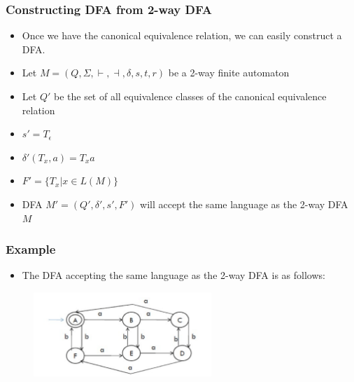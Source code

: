 \documentclass{beamer}
\newcommand{\emptyword}{\ensuremath{\epsilon}}
\begin{document}
\begin{frame}
\frametitle{Constructing DFA from 2-way DFA}
\begin{itemize}
\item Once we have the canonical equivalence relation, we can easily construct a DFA.
\item Let $M = (Q, \Sigma, \vdash, \dashv, \delta, s, t, r)$ be a 2-way finite automaton
\item Let $Q'$ be the set of all equivalence classes of the canonical equivalence relation
\item $s' = T_{\emptyword}$
\item $\delta'(T_x, a) = T_xa$
\item $F' = \{T_x|x\in L(M)\}$
\item DFA $M' = (Q', \delta', s', F')$ will accept the same language as the 2-way DFA $M$
\end{itemize}
\end{frame}

\begin{frame}
\frametitle{Example}
\begin{itemize}
\item The DFA accepting the same language as the 2-way DFA is as follows:
\end{itemize}
\begin{figure}
    \centering
        \includegraphics[width=0.6\textwidth]{dfa5.pdf}
\end{figure} 
\end{frame}
\end{document}
